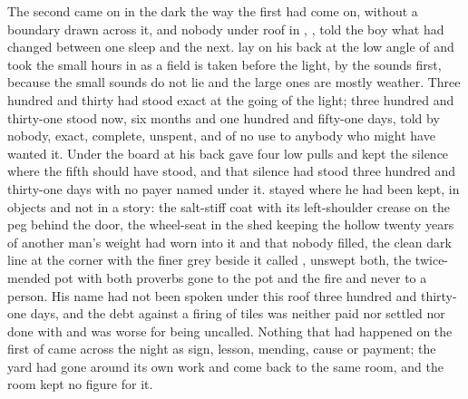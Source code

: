 
The second came on in the dark the way the first had come on, without a boundary drawn across it, and nobody under  roof in , ,  told the boy what had changed between one sleep and the next.  lay on his back at the low angle of  and took the small hours in as a field is taken before the light, by the sounds first, because the small sounds do not lie and the large ones are mostly weather. Three hundred and thirty had stood exact at the going of the light; three hundred and thirty-one stood now, six months and one hundred and fifty-one days, told by nobody, exact, complete, unspent, and of no use to anybody who might have wanted it. Under the board at his back  gave four low pulls and kept the silence where the fifth should have stood, and that silence had stood three hundred and thirty-one days with no payer named under it.  stayed where he had been kept, in objects and not in a story: the salt-stiff coat with its left-shoulder crease on the peg behind the door, the wheel-seat in the shed keeping the hollow twenty years of another man's weight had worn into it and that nobody filled, the clean dark line at the corner with the finer grey beside it called , unswept both, the twice-mended pot with both proverbs gone to the pot and the fire and never to a person. His name had not been spoken under this roof three hundred and thirty-one days, and the debt against a firing of tiles was neither paid nor settled nor done with and was worse for being uncalled. Nothing that had happened on the first of  came across the night as sign, lesson, mending, cause or payment; the yard had gone around its own work and come back to the same room, and the room kept no figure for it.

